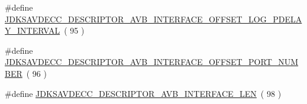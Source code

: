 \begin{DoxyCompactItemize}
\item 
\#define \hyperlink{group__descriptor__avb__interface_gaee0b83777b5fef60914c9b5e4a8baa8a}{J\+D\+K\+S\+A\+V\+D\+E\+C\+C\+\_\+\+D\+E\+S\+C\+R\+I\+P\+T\+O\+R\+\_\+\+A\+V\+B\+\_\+\+I\+N\+T\+E\+R\+F\+A\+C\+E\+\_\+\+O\+F\+F\+S\+E\+T\+\_\+\+L\+O\+G\+\_\+\+P\+D\+E\+L\+A\+Y\+\_\+\+I\+N\+T\+E\+R\+V\+AL}~( 95 )
\item 
\#define \hyperlink{group__descriptor__avb__interface_ga2aeb8522ea3072037f430a888130fb15}{J\+D\+K\+S\+A\+V\+D\+E\+C\+C\+\_\+\+D\+E\+S\+C\+R\+I\+P\+T\+O\+R\+\_\+\+A\+V\+B\+\_\+\+I\+N\+T\+E\+R\+F\+A\+C\+E\+\_\+\+O\+F\+F\+S\+E\+T\+\_\+\+P\+O\+R\+T\+\_\+\+N\+U\+M\+B\+ER}~( 96 )
\item 
\#define \hyperlink{group__descriptor__avb__interface_gaa0de60188c16df7f04fbc87d490112bc}{J\+D\+K\+S\+A\+V\+D\+E\+C\+C\+\_\+\+D\+E\+S\+C\+R\+I\+P\+T\+O\+R\+\_\+\+A\+V\+B\+\_\+\+I\+N\+T\+E\+R\+F\+A\+C\+E\+\_\+\+L\+EN}~( 98 )
\end{DoxyCompactItemize}
